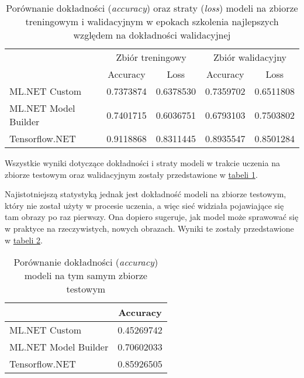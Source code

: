 \begin{table}[ht]
  \centering
  \begin{tabular}{|l|r|r|r|r|}
    \hline
                         & \multicolumn{2}{c|}{Zbiór treningowy}                                          & \multicolumn{2}{c|}{Zbiór walidacyjny}                      \\
    \cline{2-5}
                         & \multicolumn{1}{|c|}{Accuracy}        & \multicolumn{1}{|c|}{Loss}             & \multicolumn{1}{|c|}{Accuracy} & \multicolumn{1}{|c|}{Loss} \\
    \hline
    ML.NET Custom        & 0.7373874                             & 0.6378530                              & 0.7359702                      & 0.6511808                  \\
    ML.NET Model Builder & 0.7401715                             & 0.6036751                              & 0.6793103                      & 0.7503802                  \\
    Tensorflow.NET       & 0.9118868                             & 0.8311445                              & 0.8935547                      & 0.8501284                  \\
    \hline
  \end{tabular}
  \caption[Porównanie dokładności oraz straty modeli na zbiorze treningowym i walidacyjnym]{Porównanie dokładności (\emph{accuracy}) oraz straty (\emph{loss}) modeli na zbiorze treningowym i walidacyjnym w epokach szkolenia najlepszych względem na dokładności walidacyjnej}
  \label{tab:train_validation_metric_comparison}
\end{table}

Wszystkie wyniki dotyczące dokładności i straty modeli w trakcie uczenia na zbiorze testowym oraz walidacyjnym zostały przedstawione w \hyperref[tab:train_validation_metric_comparison]{tabeli \ref*{tab:train_validation_metric_comparison}}.

Najistotniejszą statystyką jednak jest dokładność modeli na zbiorze testowym, który nie został użyty w procesie uczenia, a więc sieć widziała pojawiające się tam obrazy po raz pierwszy.
Ona dopiero sugeruje, jak model może sprawować się w praktyce na rzeczywistych, nowych obrazach.
Wyniki te zostały przedstawione w \hyperref[tab:test_accuracy_comparison]{tabeli \ref*{tab:test_accuracy_comparison}}.

\begin{table}[ht]
  \centering
  \begin{tabular}{|l|r|}
    \hline
                         & \multicolumn{1}{|c|}{Accuracy} \\
    \hline
    ML.NET Custom        & 0.45269742                     \\
    ML.NET Model Builder & 0.70602033                     \\
    Tensorflow.NET       & 0.85926505                     \\
    \hline
  \end{tabular}
  \caption[Porównanie dokładności modeli na tym samym zbiorze testowym]{Porównanie dokładności (\emph{accuracy}) modeli na tym samym zbiorze testowym}
  \label{tab:test_accuracy_comparison}
\end{table}

